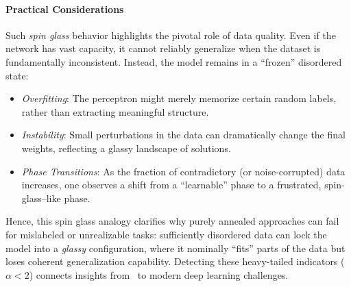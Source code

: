 \paragraph{Practical Considerations}

Such \emph{spin glass} behavior highlights the pivotal role of data quality. Even if the network has vast capacity, it cannot reliably generalize when the dataset is fundamentally inconsistent. Instead, the model remains in a ``frozen'' disordered state:
\begin{itemize}
\item \emph{Overfitting}: The perceptron might merely memorize certain random labels, rather than extracting meaningful structure.
\item \emph{Instability}: Small perturbations in the data can dramatically change the final weights, reflecting a glassy landscape of solutions.
\item \emph{Phase Transitions}: As the fraction of contradictory (or noise-corrupted) data increases, one observes a shift from a ``learnable'' phase to a frustrated, spin-glass--like phase.
\end{itemize}

Hence, this spin glass analogy clarifies why purely annealed approaches can fail for mislabeled or unrealizable tasks: sufficiently disordered data can lock the model into a \emph{glassy} configuration, where it nominally ``fits'' parts of the data but loses coherent generalization capability. Detecting these heavy-tailed indicators ($\alpha < 2$) connects insights from \STATMECH\ to modern deep learning challenges.

